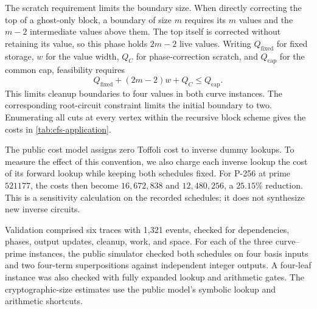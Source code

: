 \documentclass[11pt]{article}
\theoremstyle{definition}
\theoremstyle{remark}
\begin{document}
The scratch requirement limits the boundary size. When directly correcting the top of a ghost-only block, a boundary of size $m$ requires its $m$ values and the $m-2$ intermediate values above them. The top itself is corrected without retaining its value, so this phase holds $2m-2$ live values. Writing $Q_{\mathrm{fixed}}$ for fixed storage, $w$ for the value width, $Q_C$ for phase-correction scratch, and $Q_{\mathrm{cap}}$ for the common cap, feasibility requires
\[
Q_{\mathrm{fixed}}+(2m-2)w+Q_C\le Q_{\mathrm{cap}}.
\]
This limits cleanup boundaries to four values in both curve instances. The corresponding root-circuit constraint limits the initial boundary to two. Enumerating all cuts at every vertex within the recursive block scheme gives the costs in \cref{tab:cfs-application}.

The public cost model assigns zero Toffoli cost to inverse dummy lookups. To measure the effect of this convention, we also charge each inverse lookup the cost of its forward lookup while keeping both schedules fixed. For P-256 at prime $521177$, the costs then become $16{,}672{,}838$ and $12{,}480{,}256$, a $25.15\%$ reduction. This is a sensitivity calculation on the recorded schedules; it does not synthesize new inverse circuits.

Validation comprised six traces with 1,321 events, checked for dependencies, phases, output updates, cleanup, work, and space. For each of the three curve--prime instances, the public simulator checked both schedules on four basis inputs and two four-term superpositions against independent integer outputs. A four-leaf instance was also checked with fully expanded lookup and arithmetic gates. The cryptographic-size estimates use the public model's symbolic lookup and arithmetic shortcuts.

\printbibliography
\end{document}
